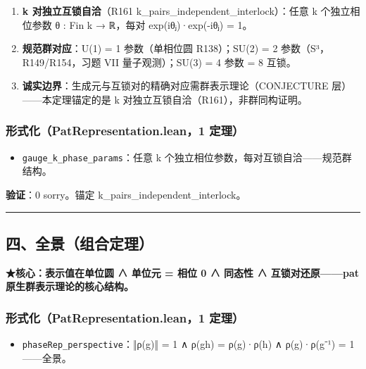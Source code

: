 \documentclass[
]{article}
\providecommand{\tightlist}{%
  \setlength{\itemsep}{0pt}\setlength{\parskip}{0pt}}
\begin{document}
\begin{enumerate}
\def\labelenumi{\arabic{enumi}.}
\tightlist
\item
  \textbf{k 对独立互锁自洽}（R161
  k\_pairs\_independent\_interlock）：任意 k 个独立相位参数 θ : Fin k →
  ℝ，每对 exp(iθⱼ)·exp(-iθⱼ) = 1。
\item
  \textbf{规范群对应}：U(1) = 1 参数（单相位圆 R138）；SU(2) = 2
  参数（S³，R149/R154，习题 VII 量子观测）；SU(3) = 4 参数 = 8 互锁。
\item
  \textbf{诚实边界}：生成元与互锁对的精确对应需群表示理论（CONJECTURE
  层）------本定理锚定的是 k 对独立互锁自洽（R161），非群同构证明。
\end{enumerate}

\subsubsection{形式化（PatRepresentation.lean，1
定理）}\label{ux5f62ux5f0fux5316patrepresentation.lean1-ux5b9aux7406}

\begin{itemize}
\tightlist
\item
  \texttt{gauge\_k\_phase\_params}：任意 k
  个独立相位参数，每对互锁自洽------规范群结构。
\end{itemize}

\textbf{验证}：0 sorry。锚定 k\_pairs\_independent\_interlock。

\begin{center}\rule{0.5\linewidth}{0.5pt}\end{center}

\subsection{四、全景（组合定理）}\label{ux56dbux5168ux666fux7ec4ux5408ux5b9aux7406}

\textbf{★核心：表示值在单位圆 ∧ 单位元 = 相位 0 ∧ 同态性 ∧
互锁对还原------pat 原生群表示理论的核心结构。}

\subsubsection{形式化（PatRepresentation.lean，1
定理）}\label{ux5f62ux5f0fux5316patrepresentation.lean1-ux5b9aux7406-1}

\begin{itemize}
\tightlist
\item
  \texttt{phaseRep\_perspective}：‖ρ(g)‖ = 1 ∧ ρ(gh) = ρ(g)·ρ(h) ∧
  ρ(g)·ρ(g⁻¹) = 1------全景。
\end{itemize}
\end{document}
